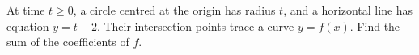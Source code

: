 At time $t\ge0$, a circle centred at the origin has radius $t$, and a horizontal line has equation $y=t-2$. Their intersection points trace a curve $y=f(x)$. Find the sum of the coefficients of $f$.
